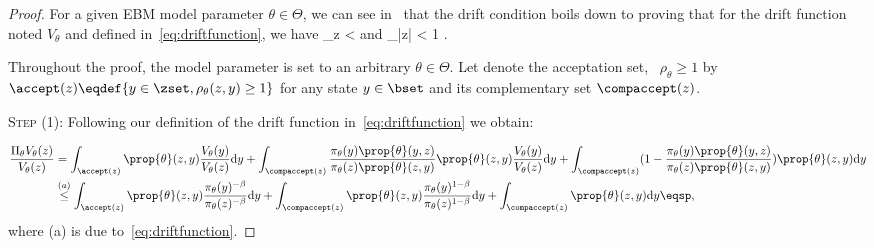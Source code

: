 \documentclass[letterpaper]{article} %
\begin{document}
\begin{proof}
For a given EBM model parameter $\theta \in \Theta$, we can see in~\citet{jarner2000geometric} that the drift condition boils down to proving that for the drift function noted $V_\theta$ and defined in~\eqref{eq:driftfunction}, we have
\beq\label{mainproof}
\sup \limits_{z \in \zset}   < \infty \quad \textrm{and} \quad \lim \sup \limits_{|z| \to \infty}   < 1 \eqsp.
\eeq

Throughout the proof, the model parameter is set to an arbitrary $\theta \in \Theta$.
Let denote the acceptation set, \ie\ $\rho_\theta \geq 1$ by $\accept(z) \eqdef \{ y \in \zset, \rho_\theta(z,y) \geq 1 \}$ for any state $y \in \bset$ and its complementary set $\compaccept(z)$.

\medskip
\noindent \textsc{Step (1): } Following our definition of the drift function in~\eqref{eq:driftfunction} we obtain:

\begin{align}\label{eq:main1}
 \frac{\Pi_\theta V_\theta(z)}{V_\theta(z)} & = \int_{\accept(z)}  \prop{\theta}(z,y) \frac{V_\theta(y)}{V_\theta(z)} \textrm{d}y +  \int_{\compaccept(z)} \frac{\pi_\theta(y)\prop{\theta}(y,z)}{\pi_\theta(z)\prop{\theta}(z,y)} \prop{\theta}(z,y) \frac{V_\theta(y)}{V_\theta(z)} \textrm{d}y +  \int_{\compaccept(z)} (1 - \frac{\pi_\theta(y)\prop{\theta}(y,z)}{\pi_\theta(z)\prop{\theta}(z,y)}) \prop{\theta}(z,y)  \textrm{d}y\\
 &  \overset{(a)}{\leq} \int_{\accept(z)}  \prop{\theta}(z,y) \frac{\pi_\theta(y)^{-\beta}}{\pi_\theta(z)^{-\beta}} \textrm{d}y  + \int_{\compaccept(z)} \prop{\theta}(z,y) \frac{\pi_\theta(y)^{1-\beta}}{\pi_\theta(z)^{1-\beta}}\textrm{d}y +  \int_{\compaccept(z)} \prop{\theta}(z,y)  \textrm{d}y \eqsp,
\end{align}
where (a) is due to~\eqref{eq:driftfunction}.


\end{proof}
\end{document}
